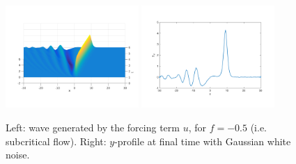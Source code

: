 \begin{figure}[!h]
\includegraphics[width = 0.45\textwidth]{images/ex1yd3D.pdf}
\includegraphics[width = 0.45\textwidth]{images/ex1yd.pdf}
\caption{Left: wave generated by the forcing term $u$, for $f = -0.5$ (i.e. subcritical flow). Right: $y$-profile at final time with Gaussian white noise.}
\label{waveobservation}
\end{figure}

